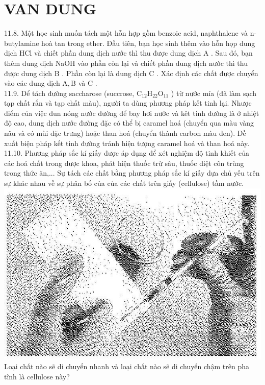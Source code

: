 \documentclass[10pt]{article}
\begin{document}
\section*{VAN DUNG}
11.8. Một học sinh muốn tách một hỗn hợp gồm benzoic acid, naphthalene và n-butylamine hoà tan trong ether. Đầu tiên, bạn học sinh thêm vào hỗn họp dung dịch HCl và chiết phần dung dịch nước thì thu được dung dịch A . Sau đó, bạn thêm dung dịch NaOH vào phần còn lại và chiết phần dung dịch nước thì thu được dung dịch B . Phần còn lại là dung dịch C . Xác định các chất được chuyển vào các dung dịch $\mathrm{A}, \mathrm{B}$ và C .\\
11.9. Dể tách đường saccharose (succrose, $\mathrm{C}_{12} \mathrm{H}_{22} \mathrm{O}_{11}$ ) từ nước mía (đã làm sạch tạp chất rắn và tạp chất màu), người ta dùng phương pháp kết tinh lại. Nhược điểm của việc đun nóng nước đường để bay hơi nước và kêt tinh đường là ở nhiệt độ cao, dung dịch nước đường đặc có thể bị caramel hoá (chuyển qua màu vàng nâu và có mùi đặc trưng) hoặc than hoá (chuyển thành carbon màu đen). Đề xuất biện pháp kết tinh đường tránh hiện tượng caramel hoá và than hoá này.\\
11.10. Phương pháp sắc kí giấy được áp dụng để xét nghiệm độ tinh khiết của các hoá chất trong dược khoa, phát hiện thuốc trừ sâu, thuốc diệt côn trùng trong thức ăn,... Sự tách các chất bằng phương pháp sắc kí giấy dựa chủ yếu trên sự khác nhau về sự phân bố của của các chất trên giấy (cellulose) tầm nước.\\
\includegraphics[max width=\textwidth, center]{2025_10_23_fa9073eecee116ad8cf2g-41}\\
Loại chất nào sẽ di chuyển nhanh và loại chất nào sẽ di chuyển chậm trên pha tĩnh là cellulose này?
\end{document}
